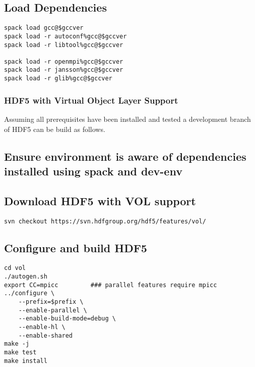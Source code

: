 \subsection{Load Dependencies}%
\label{load-dependencies}

\begin{lstlisting}
spack load gcc@$gccver
spack load -r autoconf%gcc@$gccver
spack load -r libtool%gcc@$gccver

spack load -r openmpi%gcc@$gccver
spack load -r jansson%gcc@$gccver
spack load -r glib%gcc@$gccver
\end{lstlisting}

\subsubsection{HDF5 with Virtual Object Layer Support}%
\label{hdf5-with-virtual-object-layer-support}

Assuming all prerequisites have been installed and tested a development branch of HDF5 can be build as follows.

\subsection{Ensure environment is aware of dependencies installed using spack and dev-env}%
\label{ensure-environment-is-aware-of-dependencies-installed-using-spack-and-dev-env}

\subsection{Download HDF5 with VOL support}%
\label{download-hdf5-with-vol-support}

\begin{lstlisting}
svn checkout https://svn.hdfgroup.org/hdf5/features/vol/
\end{lstlisting}

\subsection{Configure and build HDF5}%
\label{configure-and-build-hdf5}

\begin{lstlisting}
cd vol
./autogen.sh
export CC=mpicc         ### parallel features require mpicc
../configure \
    --prefix=$prefix \
    --enable-parallel \
    --enable-build-mode=debug \
    --enable-hl \
    --enable-shared
make -j
make test
make install
\end{lstlisting}


